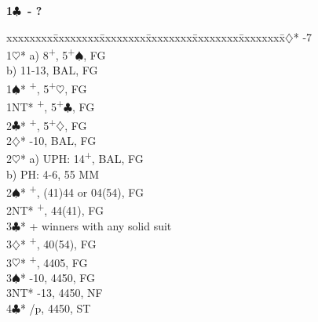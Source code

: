 \documentclass[10pt]{article}
\renewcommand{\c}{$\clubsuit$}
\renewcommand{\d}{$\diamondsuit$}
\newcommand{\h}{$\heartsuit$}
\newcommand{\s}{$\spadesuit$}
\newcommand{\p}{\textsuperscript{+}}
\newenvironment{bidtable}[1][]
{\textbf{#1}
  \begin{adjustwidth}{1em}{}
    \addvspace{2pt}
    \begin{tabbing}
      xxxxxxxx\=xxxxxxxx\=xxxxxxxx\=xxxxxxxx\=xxxxxxxx\=xxxxxxxx\=\kill}
{\end{tabbing}\end{adjustwidth}\bigskip}%
\begin{document}
\begin{multicols*}{2}

\begin{bidtable}[1\c\ - ?]
1\d* {}-7                            \\
1\h* \> a) 8\p , 5\p \s, FG            \\
     \> b) 11-13, BAL, FG              \\
1\s* {}\p, 5\p\h, FG                 \\
1NT* \p, 5\p\c, FG                 \\
2\c* {}\p, 5\p\d, FG                 \\
2\d* {}-10, BAL, FG                  \\
2\h* \> a) UPH: 14\p, BAL, FG          \\
     \> b) PH: 4-6, 55 MM              \\
2\s* {}\p, (41)44 or 04(54), FG      \\
2NT* \p, 44(41), FG                \\
3\c* {}+ winners with any solid suit \\
3\d* {}\p, 40(54), FG                \\
3\h* {}\p, 4405, FG                  \\
3\s* {}-10, 4450, FG                 \\
3NT* -13, 4450, NF                \\
4\c* {}/p, 4450, ST                 \\
\end{bidtable}


\end{multicols*}
\end{document}
